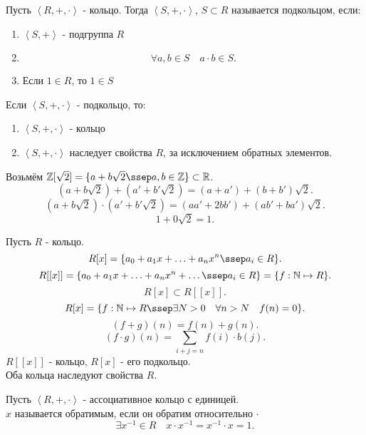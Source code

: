 \documentclass[11pt, oneside]{article}   	%
\begin{document}
    \begin{definition}
        Пусть $\left<R, +, \cdot\right>$ - кольцо. Тогда $\left<S, +, \cdot\right>$, $S \subset R$ называется подкольцом, если:
        \begin{enumerate}
            \item $\left<S, +\right>$ - подгруппа $R$ 
            \item \[ \forall{a, b\in S}\quad a\cdot b\in S .\]
            \item Если $1\in R$, то $1\in S$
        \end{enumerate}
        Если $\left<S, +, \cdot \right>$ - подкольцо, то:\\
        \begin{enumerate}
            \item $\left<S, +, \cdot \right>$ - кольцо
            \item $\left<S, +, \cdot \right>$ наследует свойства $R$, за исключением обратных элементов.
        \end{enumerate}
    \end{definition}
    \begin{example}
        Возьмём $\mathbb{Z}[\sqrt{2} ] = \{a+b\sqrt{2} \ssep a,b\in \mathbb{Z} \} \subset \mathbb{R}$.\\
        \[ (a+b\sqrt{2})+\left( a'+b'\sqrt{2}  \right) = \left( a+a'\right)+\left( b+b' \right)\sqrt{2}     .\]
        \[ (a+b\sqrt{2})\cdot (a'+b'\sqrt{2}) = \left( aa'+2bb' \right) + \left( ab'+ba' \right)\sqrt{2}   .\] 
        \[ 1+0\sqrt{2} = 1   .\] 
    \end{example}
    \begin{definition}
        Пусть $R$ - кольцо.
        \[ R[x] = \{a_0 + a_1x + \ldots + a_nx^{n}\ssep a_i\in R\}  .\] 
        \[ R[[x]] = \{a_0 + a_1x + \ldots + a_nx^{n} + \ldots\ssep a_i\in R\} = \{f: \mathbb{N} \mapsto R\}  .\]
        \[ R[x] \subset R[[x]] .\]
        \[ R[x] = \{f: \mathbb{N} \mapsto R\ssep \exists{N>0}\quad \forall{n>N}\quad f(n) = 0\}  .\]
        \[ (f+g)(n) = f(n) + g(n) .\] 
        \[ (f\cdot g)(n) = \sum\limits_{i+j=n} f(i)\cdot b(j)  .\]
        $R[[x]]$ - кольцо,  $R[x]$ - его подкольцо.\\
        Оба кольца наследуют свойства $R$.
    \end{definition}
    \begin{definition}
        Пусть $\left<R, +, \cdot \right>$ - ассоциативное кольцо с единицей.\\
        $x$ называется обратимым, если он обратим относительно $\cdot $
        \[ \exists{x^{-1}\in R}\quad x\cdot x^{-1} = x^{-1} \cdot x = 1 .\] 
    \end{definition}
\end{document}
